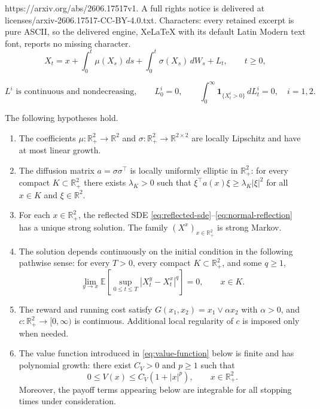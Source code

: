 \documentclass[10pt,a4paper]{amsart}
\newcommand{\R}{\mathbb{R}}
\begin{document}
https://arxiv.org/abs/2606.17517v1. A full rights notice is delivered at licenses/arxiv-2606.17517-CC-BY-4.0.txt. Characters: every retained excerpt is pure ASCII, so the delivered engine, XeLaTeX with its default Latin Modern text font, reports no missing character.
\begin{equation}
\label{eq:reflected-sde}
   X_t
   =
   x
   +\int_0^t\mu(X_s)\,ds
   +\int_0^t\sigma(X_s)\,dW_s
   +L_t,
   \qquad t\ge0,
\end{equation}

\begin{equation}
\label{eq:normal-reflection}
   L^i \text{ is continuous and nondecreasing},\qquad
   L^i_0=0,\qquad
   \int_0^\infty \mathbf 1_{\{X_t^i>0\}}\,dL_t^i=0,
   \quad i=1,2.
\end{equation}

\begin{assumption}
\label{ass:reflected-diffusion}
The following hypotheses hold.
\begin{enumerate}
\item[\textup{(A1)}]
The coefficients $\mu:\R^2_+\to\R^2$ and $\sigma:\R^2_+\to\R^{2\times2}$ are
locally Lipschitz and have at most linear growth.
\item[\textup{(A2)}]
The diffusion matrix $a=\sigma\sigma^\top$ is locally uniformly elliptic in
$\R^2_+$: for every compact $K\subset\R^2_+$ there exists $\lambda_K>0$ such
that $\xi^\top a(x)\xi\ge\lambda_K|\xi|^2$ for all $x\in K$ and $\xi\in\R^2$.
\item[\textup{(A3)}]
For each $x\in\R^2_+$, the reflected SDE
\eqref{eq:reflected-sde}--\eqref{eq:normal-reflection} has a unique strong
solution. The family $(X^x)_{x\in\R^2_+}$ is strong Markov.
\item[\textup{(A4)}]
The solution depends continuously on the initial condition in the following
pathwise sense: for every $T>0$, every compact $K\subset\R^2_+$, and some
$q\ge1$,
\[
   \lim_{y\to x}
   \mathbb E\left[
      \sup_{0\le t\le T}|X_t^y-X_t^x|^q
   \right]=0,
   \qquad x\in K.
\]
\item[\textup{(A5)}]
The reward and running cost satisfy $G(x_1,x_2)=x_1\vee \alpha x_2$ with
$\alpha>0$, and $c:\R^2_+\to[0,\infty)$ is continuous. Additional local
regularity of $c$ is imposed only when needed.
\item[\textup{(A6)}]
The value function introduced in \eqref{eq:value-function} below is finite and
has polynomial growth: there exist $C_V>0$ and $p\ge1$ such that
\[
   0\le V(x)\le C_V(1+|x|^p),
   \qquad x\in\R^2_+.
\]
Moreover, the payoff terms appearing below are integrable for all stopping
times under consideration.
\end{enumerate}
\end{assumption}
\end{document}
